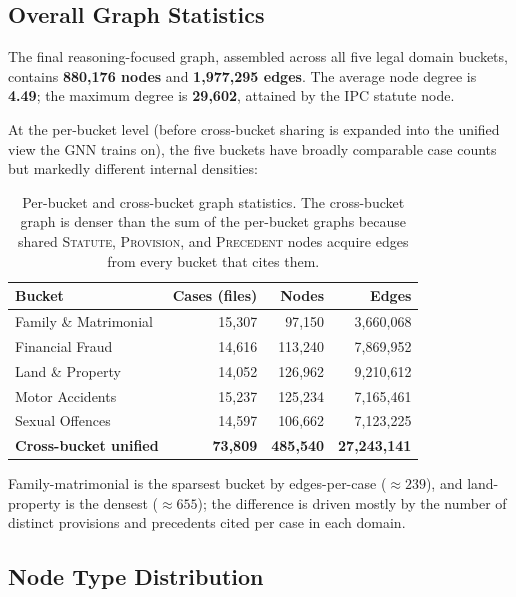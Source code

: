 \subsection{Overall Graph Statistics}

The final reasoning-focused graph, assembled across all five legal
domain buckets, contains \textbf{880{,}176 nodes} and
\textbf{1{,}977{,}295 edges}. The average node degree is
\textbf{4.49}; the maximum degree is \textbf{29{,}602}, attained by
the \textsc{IPC} statute node.

At the per-bucket level (before cross-bucket sharing is expanded into
the unified view the GNN trains on), the five buckets have broadly
comparable case counts but markedly different internal densities:

\begin{table}[H]
  \centering
  \small
  \begin{tabular}{lrrr}
    \toprule
    Bucket & Cases (files) & Nodes & Edges \\
    \midrule
    Family \& Matrimonial & 15{,}307 & 97{,}150 & 3{,}660{,}068 \\
    Financial Fraud & 14{,}616 & 113{,}240 & 7{,}869{,}952 \\
    Land \& Property & 14{,}052 & 126{,}962 & 9{,}210{,}612 \\
    Motor Accidents & 15{,}237 & 125{,}234 & 7{,}165{,}461 \\
    Sexual Offences & 14{,}597 & 106{,}662 & 7{,}123{,}225 \\
    \midrule
    \textbf{Cross-bucket unified} & \textbf{73{,}809} & \textbf{485{,}540}
      & \textbf{27{,}243{,}141} \\
    \bottomrule
  \end{tabular}
  \caption{Per-bucket and cross-bucket graph statistics. The
  cross-bucket graph is denser than the sum of the per-bucket graphs
  because shared \textsc{Statute}, \textsc{Provision}, and
  \textsc{Precedent} nodes acquire edges from every bucket that cites
  them.}
  \label{tab:graph_stats}
\end{table}

Family-matrimonial is the sparsest bucket by edges-per-case
(\(\approx 239\)), and land-property is the densest (\(\approx 655\));
the difference is driven mostly by the number of distinct provisions
and precedents cited per case in each domain.

\subsection{Node Type Distribution}

